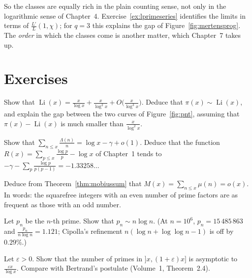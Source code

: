 So the classes are equally rich in the plain counting sense, not only in the logarithmic sense of Chapter~4. Exercise~\ref{ex:lprimeseries} identifies the limits in terms of
$\frac{L'}L(1,\chi)$; for $q=3$ this explains the gap of Figure~\ref{fig:mertensprog}. The \emph{order} in which the classes come is another matter, which Chapter~7 takes up.

\section{Exercises}

\begin{exercise}[$\star$]\label{ex:li}
Show that $\operatorname{Li}(x)=\frac x{\log x}+\frac x{\log^2x}+O\bigl(\frac x{\log^3x}\bigr)$. Deduce that $\pi(x)\sim\operatorname{Li}(x)$, and explain the gap between the two curves of Figure~\ref{fig:pnt},
assuming that $\pi(x)-\operatorname{Li}(x)$ is much smaller than $\frac x{\log^2x}$.
\end{exercise}

\begin{exercise}[$\star\star$]\label{ex:rlimit}
Show that $\sum_{n\le x}\frac{\Lambda(n)}n=\log x-\gamma+o(1)$. Deduce that the function $R(x)=\sum_{p\le x}\frac{\log p}p-\log x$ of Chapter~1 tends to
$-\gamma-\sum_p\frac{\log p}{p(p-1)}=-1.33258\ldots$
\end{exercise}

\begin{exercise}[$\star$]\label{ex:mertensfn}
Deduce from Theorem~\ref{thm:mobiussum} that $M(x)=\sum_{n\le x}\mu(n)=o(x)$. In words: the squarefree integers with an even number of prime factors are as frequent as those with
an odd number.
\end{exercise}

\begin{exercise}\label{ex:nthprime}
Let $p_n$ be the $n$-th prime. Show that $p_n\sim n\log n$. (At $n=10^6$, $p_n=15\,485\,863$ and $\frac{p_n}{n\log n}=1.121$; Cipolla's refinement $n(\log n+\log\log n-1)$ is off by $0.29\%$.)
\end{exercise}

\begin{exercise}[$\star$]\label{ex:shortint}
Let $\varepsilon>0$. Show that the number of primes in $]x,(1+\varepsilon)x]$ is asymptotic to $\frac{\varepsilon x}{\log x}$. Compare with Bertrand's postulate (Volume~1, Theorem~2.4).
\end{exercise}

